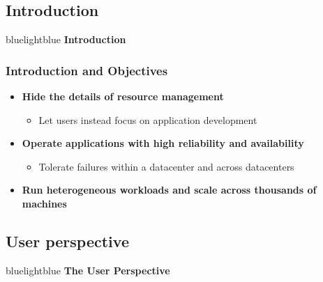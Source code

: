 \subsection{Introduction}
\begin{frame}
 \begin{colorblock}{blue}{lightblue}{ }
    \Large \textbf{Introduction}
  \end{colorblock}
\end{frame}

\begin{frame}
\frametitle{Introduction and Objectives}
\begin{itemize}
	\item {\bf Hide the details of resource management}
	\begin{itemize}
		\item Let users instead focus on application development
	\end{itemize}

\vspace{20pt}

	\item {\bf Operate applications with high reliability and availability}
	\begin{itemize}
		\item Tolerate failures within a datacenter and across datacenters
	\end{itemize}

\vspace{20pt}

	\item {\bf Run heterogeneous workloads and scale across thousands of machines}
\end{itemize}
\end{frame}

\subsection{User perspective}
\begin{frame}
 \begin{colorblock}{blue}{lightblue}{ }
    \Large \textbf{The User Perspective}
  \end{colorblock}
\end{frame}

